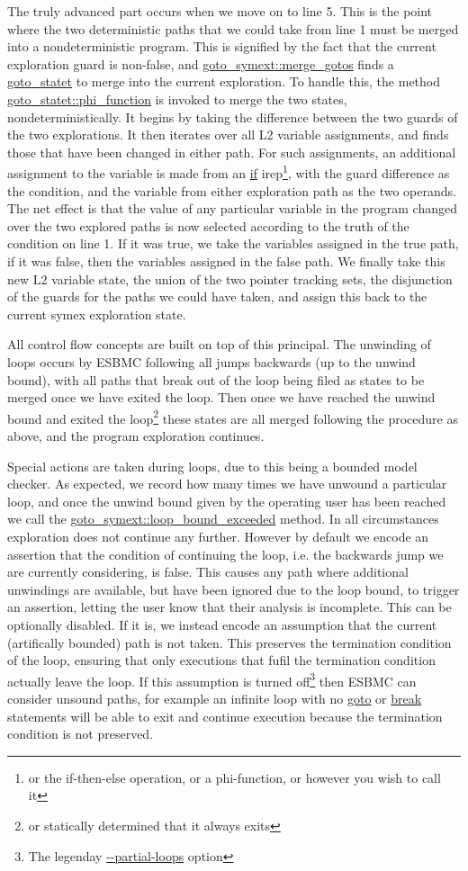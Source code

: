 \documentclass{article}
\begin{document}
The truly advanced part occurs when we move on to line 5. This is the point
where the two deterministic paths that we could take from line 1 must be
merged into a nondeterministic program. This is signified by the fact that the
current exploration guard is non-false, and \url{goto_symext::merge_gotos}
finds a \url{goto_statet} to merge into the current exploration. To handle
this, the method \url{goto_statet::phi_function} is invoked to merge the
two states, nondeterministically. It begins by taking the difference between
the two guards of the two explorations. It then iterates over all L2 variable
assignments, and finds those that have been changed in either path. For such
assignments, an additional assignment to the variable is made from an
\url{if} irep\footnote{or the if-then-else operation, or a phi-function, or
however you wish to call it}, with the guard difference as the condition, and
the variable from either exploration path as the two operands. The net effect
is that the value of any particular variable in the program changed over the
two explored paths is now selected according to the truth of the condition
on line 1. If it was true, we take the variables assigned in the true path,
if it was false, then the variables assigned in the false path. We finally
take this new L2 variable state, the union of the two pointer tracking sets,
the disjunction of the guards for the paths we could have taken, and assign
this back to the current symex exploration state.

All control flow concepts are built on top of this principal. The unwinding of
loops occurs by ESBMC following all jumps backwards (up to the unwind bound),
with all paths that break out of the loop being filed as states to be merged
once we have exited the loop. Then once we have reached the unwind bound and
exited the loop\footnote{or statically determined that it always exits} these
states are all merged following the procedure as above, and the program
exploration continues.

Special actions are taken during loops, due to this being a bounded model
checker. As expected, we record how many times we have unwound a particular
loop, and once the unwind bound given by the operating user has been reached
we call the \url{goto_symext::loop_bound_exceeded} method. In all
circumstances exploration does not continue any further. However by default
we encode an assertion that the condition of continuing the loop, i.e. the
backwards jump we are currently considering, is false. This causes any path
where additional unwindings are available, but have been ignored due to the loop
bound, to trigger an assertion, letting the user know that their analysis is
incomplete. This can be optionally disabled. If it is, we instead encode an
assumption that the current (artifically bounded) path is not taken. This
preserves the termination condition of the loop, ensuring that only executions
that fufil the termination condition actually leave the loop. If this assumption
is turned off\footnote{The legenday \url{--partial-loops} option} then
ESBMC can consider unsound paths, for example an infinite loop with no
\url{goto} or \url{break} statements will be able to exit and continue
execution because the termination condition is not preserved.
\end{document}
